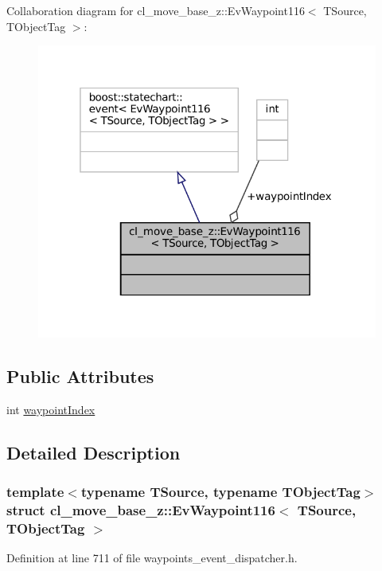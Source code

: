 Collaboration diagram for cl\+\_\+move\+\_\+base\+\_\+z\+:\+:Ev\+Waypoint116$<$ T\+Source, T\+Object\+Tag $>$\+:
\nopagebreak
\begin{figure}[H]
\begin{center}
\leavevmode
\includegraphics[width=319pt]{structcl__move__base__z_1_1EvWaypoint116__coll__graph}
\end{center}
\end{figure}
\subsection*{Public Attributes}
\begin{DoxyCompactItemize}
\item 
int \hyperlink{structcl__move__base__z_1_1EvWaypoint116_ac07e740bd30a8760d40622729217193e}{waypoint\+Index}
\end{DoxyCompactItemize}


\subsection{Detailed Description}
\subsubsection*{template$<$typename T\+Source, typename T\+Object\+Tag$>$\newline
struct cl\+\_\+move\+\_\+base\+\_\+z\+::\+Ev\+Waypoint116$<$ T\+Source, T\+Object\+Tag $>$}



Definition at line 711 of file waypoints\+\_\+event\+\_\+dispatcher.\+h.




